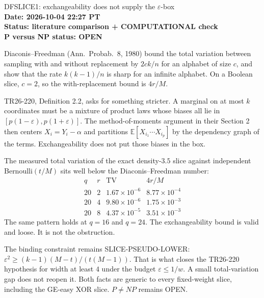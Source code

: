 \documentclass[11pt]{article}
\begin{document}
\begin{center}
{\Large DFSLICE1: exchangeability does not supply the $\varepsilon$-box}\\[4pt]
\textbf{Date: 2026-10-04 22:27 PT}\\
\textbf{Status: literature comparison + COMPUTATIONAL check}\\
\textbf{P versus NP status: OPEN}
\end{center}

Diaconis--Freedman (Ann.\ Probab.\ 8, 1980) bound the total variation between sampling with and without replacement by $2ck/n$ for an alphabet of size $c$, and show that the rate $k(k-1)/n$ is sharp for an infinite alphabet. On a Boolean slice, $c=2$, so the with-replacement bound is $4r/M$.

TR26-220, Definition 2.2, asks for something stricter. A marginal on at most $k$ coordinates must be a mixture of product laws whose biases all lie in $[p(1-\varepsilon),p(1+\varepsilon)]$. The method-of-moments argument in their Section 2 then centers $X_i=Y_i-\alpha$ and partitions $\mathbb E[X_{i_1}\cdots X_{i_p}]$ by the dependency graph of the terms. Exchangeability does not put those biases in the box.

The measured total variation of the exact density-$3.5$ slice against independent Bernoulli$(t/M)$ sits well below the Diaconis--Freedman number:
\[
\begin{array}{c|c|c|c}
q&r&\mathrm{TV}&4r/M\\
\hline
20&2&1.67\times 10^{-6}&8.77\times 10^{-4}\\
20&4&9.80\times 10^{-6}&1.75\times 10^{-3}\\
20&8&4.37\times 10^{-5}&3.51\times 10^{-3}
\end{array}
\]
The same pattern holds at $q=16$ and $q=24$. The exchangeability bound is valid and loose. It is not the obstruction.

The binding constraint remains SLICE-PSEUDO-LOWER: $\varepsilon^2\ge (k-1)(M-t)/(t(M-1))$. That is what closes the TR26-220 hypothesis for width at least $4$ under the budget $\varepsilon\le 1/w$. A small total-variation gap does not reopen it. Both facts are generic to every fixed-weight slice, including the GE-easy XOR slice. $P\ne NP$ remains OPEN.
\end{document}
